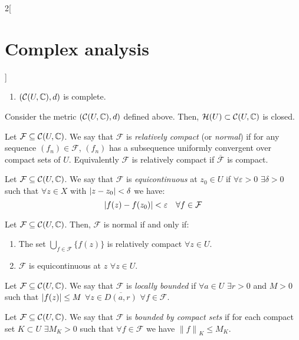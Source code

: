 \documentclass[../../../main_math.tex]{subfiles}
\begin{document}
\begin{multicols}{2}[\section{Complex analysis}]
\begin{theorem}
\begin{enumerate}
      \item $(\mathcal{C}(U,\mathbb{C}),d)$ is complete.
    \end{enumerate}
  \end{theorem}
  \begin{proposition}
    Consider the metric $(\mathcal{C}(U,\mathbb{C}),d)$ defined above. Then, $\mathcal{H}(U)\subset\mathcal{C}(U,\mathbb{C})$ is closed.
  \end{proposition}
  \begin{definition}
    Let $\mathcal{F}\subseteq \mathcal{C}(U,\mathbb{C})$. We say that $\mathcal{F}$ is \emph{relatively compact} (or \emph{normal}) if for any sequence $(f_n)\in\mathcal{F}$, $(f_n)$ has a subsequence uniformly convergent over compact sets of $U$. Equivalently $\mathcal{F}$ is relatively compact if $\overline{\mathcal{F}}$ is compact.
  \end{definition}
  \begin{definition}
    Let $\mathcal{F}\subseteq \mathcal{C}(U,\mathbb{C})$. We say that $\mathcal{F}$ is \emph{equicontinuous} at $z_0\in U$ if $\forall \varepsilon>0$ $\exists \delta>0$ such that $\forall z\in X$ with $\abs{z-z_0}<\delta$ we have: $$\abs{f(z)-f(z_0)}<\varepsilon\quad\forall f\in \mathcal{F}$$
  \end{definition}
  \begin{theorem}
    Let $\mathcal{F}\subseteq \mathcal{C}(U,\mathbb{C})$. Then, $\mathcal{F}$ is normal if and only if:
    \begin{enumerate}
      \item The set $\bigcup_{f\in\mathcal{F}}\{f(z)\}$ is relatively compact $\forall z\in U$.
      \item $\mathcal{F}$ is equicontinuous at $z$ $\forall z\in U$.
    \end{enumerate}
  \end{theorem}
  \begin{definition}
    Let $\mathcal{F}\subseteq \mathcal{C}(U,\mathbb{C})$. We say that $\mathcal{F}$ is \emph{locally bounded} if $\forall a\in U$ $\exists r>0$ and $M>0$ such that $\abs{f(z)}\leq M$ $\forall z\in \overline{D(a,r)}$ $\forall f\in\mathcal{F}$.
  \end{definition}
  \begin{definition}
    Let $\mathcal{F}\subseteq \mathcal{C}(U,\mathbb{C})$. We say that $\mathcal{F}$ is \emph{bounded by compact sets} if for each compact set $K\subset U$ $\exists M_K>0$ such that $\forall f\in\mathcal{F}$ we have ${\|f\|}_{K}\leq M_K$.
  \end{definition}

\end{multicols}
\end{document}
